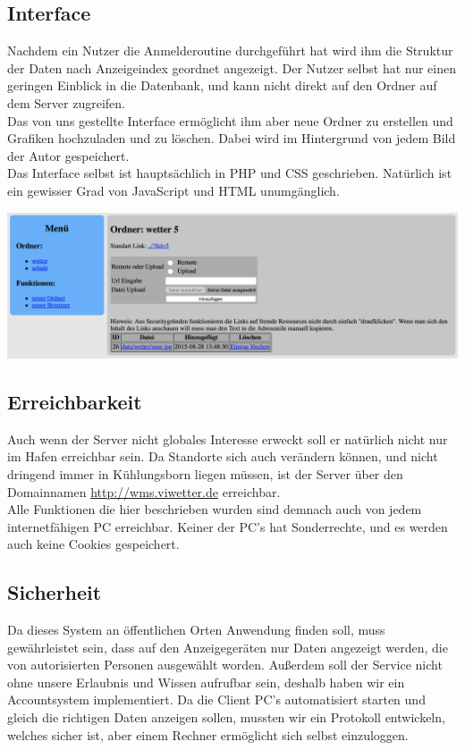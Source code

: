 \documentclass[a4paper,oneside,12pt,titlepage]{article}
\newcommand{\link}[1]{\textcolor{link}{\url{#1}}}	%
\begin{document}
\subsection{Interface} %
Nachdem ein Nutzer die Anmelderoutine durchgeführt hat wird ihm die Struktur der Daten nach Anzeigeindex geordnet angezeigt. Der Nutzer selbst hat nur einen geringen Einblick in die Datenbank, und kann nicht direkt auf den Ordner auf dem Server zugreifen.\\
Das von uns gestellte Interface ermöglicht ihm aber neue Ordner zu erstellen und Grafiken hochzuladen und zu löschen. Dabei wird im Hintergrund von jedem Bild der Autor gespeichert. \\
Das Interface selbst ist hauptsächlich in PHP und CSS geschrieben. Natürlich ist ein gewisser Grad von JavaScript und HTML unumgänglich.
\begin{center}
\includegraphics[width=\linewidth]{imgs/wms/wms_interface.png}
\end{center}

\subsection{Erreichbarkeit} %
Auch wenn der Server nicht globales Interesse erweckt soll er natürlich nicht nur im Hafen erreichbar sein. Da Standorte sich auch verändern können, und nicht dringend immer in Kühlungsborn liegen müssen, ist der Server über den Domainnamen \link{http://wms.viwetter.de} erreichbar. \\
Alle Funktionen die hier beschrieben wurden sind demnach auch von jedem internetfähigen PC erreichbar. Keiner der PC's hat Sonderrechte, und es werden auch keine Cookies gespeichert.

\subsection{Sicherheit} %
Da dieses System an öffentlichen Orten Anwendung finden soll, muss gewährleistet sein, dass auf den Anzeigegeräten nur Daten angezeigt werden, die von autorisierten Personen ausgewählt worden. Außerdem soll der Service nicht ohne unsere Erlaubnis und Wissen aufrufbar sein, deshalb haben wir ein Accountsystem implementiert. Da die Client PC's automatisiert starten und gleich die richtigen Daten anzeigen sollen, mussten wir ein Protokoll entwickeln, welches sicher ist, aber einem Rechner ermöglicht sich selbst einzuloggen.
\end{document}
